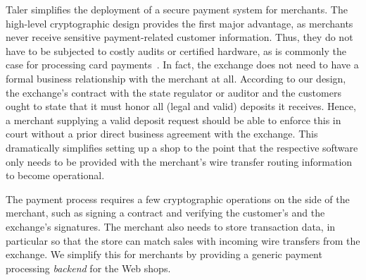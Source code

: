 \documentclass{llncs}
\begin{document}
Taler simplifies the deployment of a secure payment system for
merchants. The high-level cryptographic design provides the first
major advantage, as merchants never receive sensitive payment-related
customer information.  Thus, they do not have to be subjected to
costly audits or certified hardware, as is commonly the case for
processing card payments~\cite{pcidss}. In fact, the exchange does not
need to have a formal business relationship with the merchant at all.
According to our design, the exchange's contract with the state
regulator or auditor and the customers ought to state that it must
honor all (legal and valid) deposits it receives.  Hence, a merchant
supplying a valid deposit request should be able to enforce this in
court without a prior direct business agreement with the exchange.
This dramatically simplifies setting up a shop to the point that the
respective software only needs to be provided with the merchant's wire
transfer routing information to become operational.

The payment process requires a
few cryptographic operations on the side of the merchant, such as
signing a contract and verifying the customer's and the exchange's
signatures.  The merchant also needs to store transaction data, in
particular so that the store can match sales with incoming wire
transfers from the exchange.  We simplify this for merchants by
providing a generic payment processing {\em backend} for the Web
shops.
\end{document}
